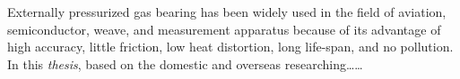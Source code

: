 \begin{abstracte}
    
Externally pressurized gas bearing has been widely used in the field of aviation,
semiconductor, weave, and measurement apparatus because of its advantage of high accuracy,
little friction, low heat distortion, long life-span, and no pollution.
In this \textit{thesis}, based on the domestic and overseas researching\ldots\ldots

\end{abstracte}
